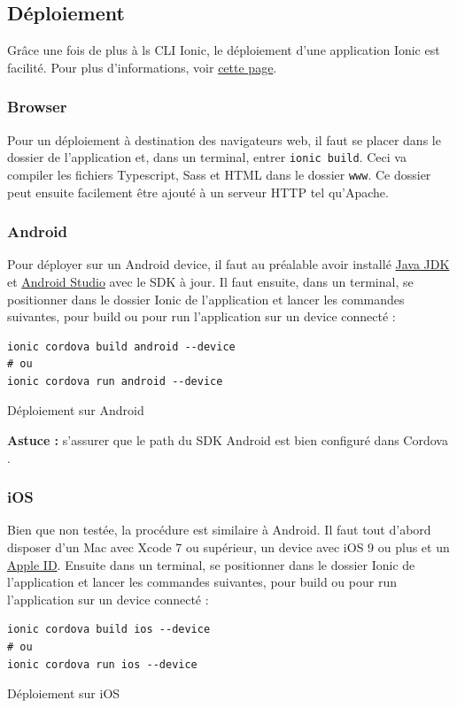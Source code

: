 \documentclass[a4paper, 12pt]{article}
\newenvironment{code}{\captionsetup{type=listing}}{}
\begin{document}
\subsection{Déploiement}
Grâce une fois de plus à ls CLI Ionic, le déploiement d'une application Ionic est facilité. Pour plus d'informations, voir
\href{https://ionicframework.com/docs/intro/deploying/}{cette page}.
\subsubsection{Browser}
Pour un déploiement à destination des navigateurs web, il faut se placer dans le dossier de l'application et, dans
un terminal, entrer \texttt{ionic build}. Ceci va compiler les fichiers Typescript, Sass et HTML dans le
dossier \texttt{www}. Ce dossier peut ensuite facilement être ajouté à un serveur HTTP tel qu'Apache.

\subsubsection{Android}
Pour déployer sur un Android device, il faut au préalable avoir installé
\href{http://www.oracle.com/technetwork/java/javase/downloads/index-jsp-138363.html}{Java JDK} et
\href{https://developer.android.com/studio/index.html}{Android Studio} avec le SDK à jour. Il faut ensuite, dans un
terminal, se positionner dans le dossier Ionic de l'application et lancer les commandes suivantes, pour build ou pour
run l'application sur un device connecté :
\begin{code}
    \begin{verbatim}
ionic cordova build android --device
# ou
ionic cordova run android --device
    \end{verbatim}
    \caption{Déploiement sur Android}
\end{code}
\textbf{Astuce : } s'assurer que le path du SDK Android est bien configuré dans Cordova \cite{ref60}.

\subsubsection{iOS}
Bien que non testée, la procédure est similaire à Android. Il faut tout d'abord disposer d'un Mac avec Xcode 7 ou
supérieur, un device avec iOS 9 ou plus et un \href{https://appleid.apple.com/}{Apple ID}. Ensuite dans un
terminal, se positionner dans le dossier Ionic de l'application et lancer les commandes suivantes, pour build ou pour
run l'application sur un device connecté :
\begin{code}
    \begin{verbatim}
ionic cordova build ios --device
# ou
ionic cordova run ios --device
    \end{verbatim}
    \caption{Déploiement sur iOS}
\end{code}
\end{document}

